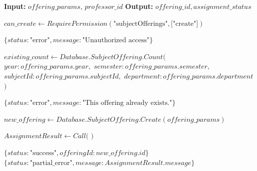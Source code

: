 \begin{algorithm}[H]
\caption{Offering Creation Workflow (Part 1: Validation and Initialization)}
\begin{algorithmic}[1]

\State \textbf{Input:} $offering\_params$, $professor\_id$
\State \textbf{Output:} $offering\_id, assignment\_status$


    \State {}
    \State $can\_create \gets RequirePermission(\text{"subjectOfferings"}, \text{["create"]})$

        \State \Return $\{status: \text{"error"}, message: \text{"Unauthorized access"}\}$
    \EndIf

    \State {}
    \State $existing\_count \gets Database.SubjectOffering.Count($
    \State \quad $year: offering\_params.year,$
    \State \quad $semester: offering\_params.semester,$
    \State \quad $subjectId: offering\_params.subjectId,$
    \State \quad $department: offering\_params.department$
    \State $)$

        \State \Return $\{status: \text{"error"}, message: \text{"This offering already exists."}\}$
    \EndIf

    \State {}
    \State $new\_offering \gets Database.SubjectOffering.Create(offering\_params)$

    \State {}
    \State $AssignmentResult \gets Call($  $)$

        \State \Return $\{status: \text{"success"}, offeringId: new\_offering.id\}$
    \Else
        \State \Return $\{status: \text{"partial\_error"}, message: AssignmentResult.message\}$
    \EndIf

\EndFunction

\end{algorithmic}
\end{algorithm}

